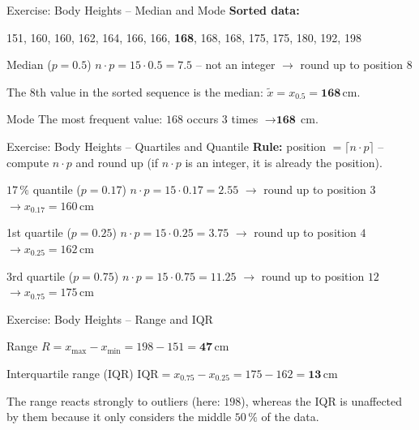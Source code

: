 \documentclass[aspectratio=169,11pt]{beamer}
\begin{document}
\begin{frame}{Exercise: Body Heights -- Median and Mode}
  \textbf{Sorted data:}
  \begin{center}
    \small 151, 160, 160, 162, 164, 166, 166, \textbf{168}, 168, 168, 175, 175, 180, 192, 198
  \end{center}
  \vspace{0.2cm}
  \begin{block}{Median ($p = 0.5$)}
    $n \cdot p = 15 \cdot 0.5 = 7.5$ -- not an integer $\rightarrow$ round up to position $8$

    The 8th value in the sorted sequence is the median: $\tilde{x} = x_{0.5} = \textbf{168}$\,cm.
  \end{block}
  \vspace{0.2cm}
  \begin{block}{Mode}
    The most frequent value: $168$ occurs $3$ times $\rightarrow \textbf{168}$\,cm.
  \end{block}
\end{frame}

\begin{frame}{Exercise: Body Heights -- Quartiles and Quantile}
  \textbf{Rule:} position $= \lceil n \cdot p \rceil$ -- compute $n \cdot p$ and
  round up (if $n \cdot p$ is an integer, it is already the position).
  \vspace{0.2cm}
  \begin{exampleblock}{$17\,\%$ quantile ($p = 0.17$)}
    $n \cdot p = 15 \cdot 0.17 = 2.55$ $\rightarrow$ round up to position $3$
    $\rightarrow x_{0.17} = 160$\,cm
  \end{exampleblock}
  \begin{exampleblock}{1st quartile ($p = 0.25$)}
    $n \cdot p = 15 \cdot 0.25 = 3.75$ $\rightarrow$ round up to position $4$
    $\rightarrow x_{0.25} = 162$\,cm
  \end{exampleblock}
  \begin{exampleblock}{3rd quartile ($p = 0.75$)}
    $n \cdot p = 15 \cdot 0.75 = 11.25$ $\rightarrow$ round up to position $12$
    $\rightarrow x_{0.75} = 175$\,cm
  \end{exampleblock}
\end{frame}

\begin{frame}{Exercise: Body Heights -- Range and IQR}
  \begin{block}{Range}
    $R = x_{\max} - x_{\min} = 198 - 151 = \textbf{47}$\,cm
  \end{block}
  \vspace{0.3cm}
  \begin{block}{Interquartile range (IQR)}
    $\text{IQR} = x_{0.75} - x_{0.25} = 175 - 162 = \textbf{13}$\,cm
  \end{block}
  \vspace{0.3cm}
  The range reacts strongly to outliers (here: $198$),
  whereas the IQR is unaffected by them because it only considers the middle $50\,\%$ of the data.
\end{frame}
\end{document}
